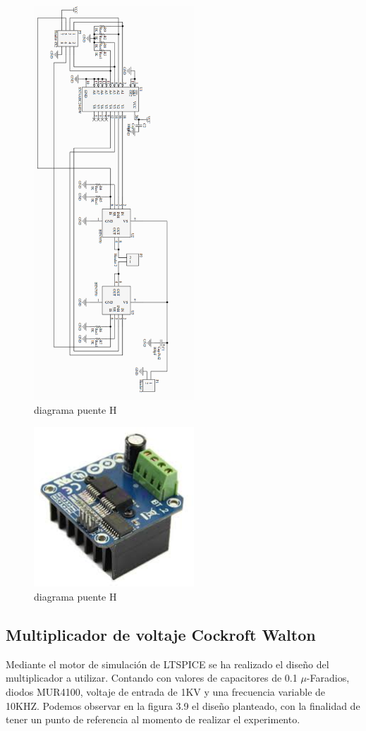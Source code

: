 \begin{figure}[H]
\centering
\includegraphics[width=6cm]{Capitulo3/figs/ibt2.png}
\caption{diagrama puente H}
\end{figure}

\begin{figure}[H]
\centering
\includegraphics[width=6cm]{Capitulo3/figs/bts.jpg}
\caption{diagrama puente H}
\end{figure}

\newpage


\subsection{Multiplicador de voltaje Cockroft Walton}
Mediante el motor de simulación de LTSPICE se ha realizado el diseño del multiplicador a utilizar. Contando con valores de capacitores de 0.1 $\mu$-Faradios, diodos MUR4100, voltaje de entrada de 1KV y una frecuencia variable de 10KHZ. Podemos observar en la figura 3.9 el diseño planteado, con la finalidad de tener un punto de referencia al momento de realizar el experimento. \\

